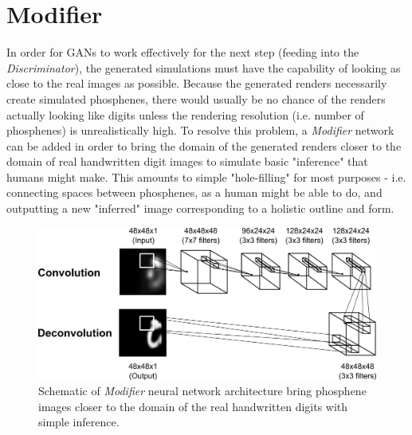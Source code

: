 \documentclass[a4paper,11pt,openany]{book}
\begin{document}
\section*{Modifier}
\label{sec:orgc3d4fa9}

In order for GANs to work effectively for the next step (feeding into the \emph{Discriminator}), the generated simulations must have the capability of looking as close to the real images as possible.
Because the generated renders necessarily create simulated phosphenes, there would usually be no chance of the renders actually looking like digits unless the rendering resolution (i.e. number of phosphenes) is unrealistically high.
To resolve this problem, a \emph{Modifier} network can be added in order to bring the domain of the generated renders closer to the domain of real handwritten digit images to simulate basic "inference" that humans might make.
This amounts to simple "hole-filling" for most purposes - i.e. connecting spaces between phosphenes, as a human might be able to do, and outputting a new "inferred" image corresponding to a holistic outline and form.

\begin{figure}
\begin{center}
\includegraphics[width=.9\linewidth]{./images/methods_modifier.png}
\end{center}
\caption[Schematic of \emph{Modifier} architecture. ]{\label{org60a28ce}
Schematic of \emph{Modifier} neural network architecture bring phosphene images closer to the domain of the real handwritten digits with simple inference.}
\end{figure}
\end{document}
